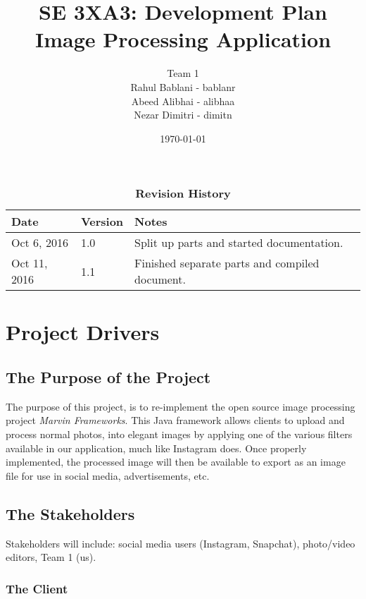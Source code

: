 \documentclass[12pt, titlepage]{article}
\title{SE 3XA3: Development Plan\\Image Processing Application}
\author{Team 1 \1
		\\ Rahul Bablani - bablanr
		\\ Abeed Alibhai - alibhaa
		\\ Nezar Dimitri - dimitn
}
\date{\today}
\begin{document}
\maketitle

\tableofcontents
\listoftables
\listoffigures

\begin{table}[bp]
\caption{\bf Revision History}
\begin{tabularx}{\textwidth}{p{3cm}p{2cm}X}
\toprule {\bf Date} & {\bf Version} & {\bf Notes}\\
\midrule
Oct 6, 2016 & 1.0 & Split up parts and started documentation.\\
Oct 11, 2016 & 1.1 & Finished separate parts and compiled document.\\
\bottomrule
\end{tabularx}
\end{table}

\newpage


\section{Project Drivers}

\subsection{The Purpose of the Project}

The purpose of this project, is to re-implement the open source image processing project \textit{Marvin Frameworks}. This Java framework allows clients to upload and process normal photos, into elegant images by applying one of the various filters available in our application, much like Instagram does. Once properly implemented, the processed image will then be available to export as an image file for use in social media, advertisements, etc.

\subsection{The Stakeholders}

Stakeholders will include: social media users (Instagram, Snapchat), photo/video editors, Team 1 (us).

\subsubsection{The Client}
\end{document}
